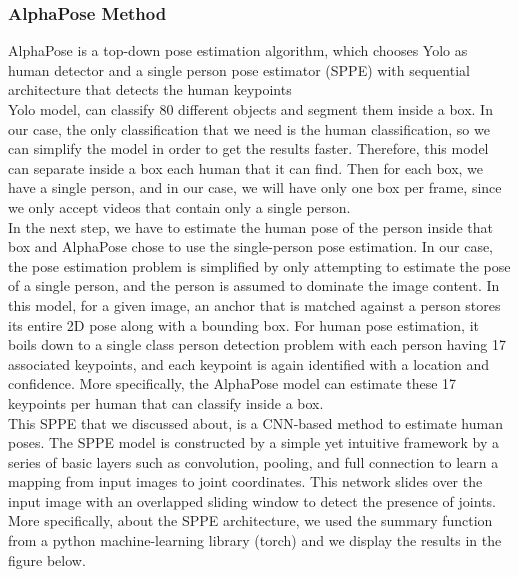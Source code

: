\subsubsection*{AlphaPose Method}

AlphaPose is a top-down pose estimation algorithm, which chooses Yolo \cite{YOLO-Pose,YOLOv3} as human detector and a single person pose estimator (SPPE) \cite{SPPE} with sequential architecture that detects the human keypoints\\

Yolo model, can classify 80 different objects and segment them inside a box. In our case, the only classification that we need is the human classification, so we can simplify the model in order to get the results faster. Therefore, this model can separate inside a box each human that it can find. Then for each box, we have a single person, and in our case, we will have only one box per frame, since we only accept videos that contain only a single person. \\

In the next step, we have to estimate the human pose of the person inside that box and AlphaPose chose to use the single-person pose estimation. In our case, the pose estimation problem is simplified by only attempting to estimate the pose of a single person, and the person is assumed to dominate the image content. In this model, for a given image, an anchor that is matched against a person stores its entire 2D pose along with a bounding box. For human pose estimation, it boils down to a single class person detection problem with each person having 17 associated keypoints, and each keypoint is again identified with a location and confidence. More specifically, the AlphaPose model can estimate these 17 keypoints per human that can classify inside a box.\\

This SPPE that we discussed about, is a CNN-based method to estimate human poses. The SPPE model is constructed by a simple yet intuitive framework by a series of basic layers such as convolution, pooling, and full connection to learn a mapping from input images to joint coordinates. This network slides over the input image with an overlapped sliding window to detect the presence of joints. More specifically, about the SPPE architecture, we used the summary function from a python machine-learning library (torch) and we display the results in the figure below.


